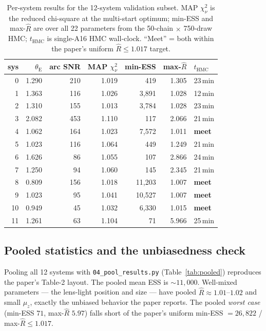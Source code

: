 \documentclass[11pt,letterpaper]{article}
\newcommand{\thetaE}{\ensuremath{\theta_{\mathrm{E}}}}
\newcommand{\Rhat}{\ensuremath{\hat{R}}}
\newcommand{\chisq}{\ensuremath{\chi^2_\nu}}
\newcommand{\muz}{\ensuremath{\mu_z}}
\begin{document}
\begin{table}[ht]
\centering
\caption{Per-system results for the 12-system validation subset. MAP
$\chisq$ is the reduced chi-square at the multi-start optimum; min-ESS and
max-$\Rhat$ are over all 22 parameters from the 50-chain $\times$ 750-draw
HMC; $t_{\mathrm{HMC}}$ is single-A16 HMC wall-clock. ``Meet'' = both within
the paper's uniform $\Rhat\le1.017$ target.}
\label{tab:persys}
\begin{tabular}{rrrrrrl}
\toprule
sys & \thetaE & arc SNR & MAP $\chisq$ & min-ESS & max-$\Rhat$ & $t_{\mathrm{HMC}}$ \\
\midrule
0  & 1.290 & 210 & 1.019 & 419    & 1.305 & 23\,min \\
1  & 1.363 & 116 & 1.026 & 3{,}891  & 1.028 & 12\,min \\
2  & 1.310 & 155 & 1.013 & 3{,}784  & 1.028 & 23\,min \\
3  & 2.082 & 453 & 1.110 & 117    & 2.066 & 21\,min \\
4  & 1.062 & 164 & 1.023 & 7{,}572  & 1.011 & \textbf{meet} \\
5  & 1.023 & 116 & 1.064 & 449    & 1.249 & 21\,min \\
6  & 1.626 & 86  & 1.055 & 107    & 2.866 & 24\,min \\
7  & 1.250 & 94  & 1.060 & 145    & 2.345 & 21\,min \\
8  & 0.809 & 156 & 1.018 & 11{,}203 & 1.007 & \textbf{meet} \\
9  & 1.023 & 95  & 1.041 & 10{,}527 & 1.007 & \textbf{meet} \\
10 & 0.949 & 45  & 1.032 & 6{,}330  & 1.015 & \textbf{meet} \\
11 & 1.261 & 63  & 1.104 & 71     & 5.966 & 25\,min \\
\bottomrule
\end{tabular}
\end{table}

\subsection{Pooled statistics and the unbiasedness check}

Pooling all 12 systems with \texttt{04\_pool\_results.py}
(Table~\ref{tab:pooled}) reproduces the paper's Table-2 layout. The pooled
mean ESS is ${\sim}11{,}000$. Well-mixed parameters --- the lens-light
position and size --- have pooled $\Rhat\approx1.01$--$1.02$ and small
$\muz$, exactly the unbiased behavior the paper reports. The pooled
\emph{worst case} (min-ESS $71$, max-$\Rhat$ $5.97$) falls short of the
paper's uniform min-ESS $=26{,}822$ / max-$\Rhat\le1.017$.
\end{document}
